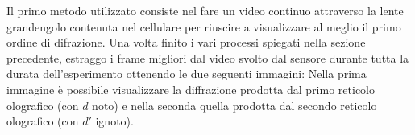 Il primo metodo utilizzato consiste nel fare un video continuo attraverso la lente grandengolo contenuta nel cellulare per riuscire a visualizzare al meglio il primo ordine di difrazione. Una volta finito i vari processi spiegati nella sezione precedente, estraggo i frame migliori dal video svolto dal sensore durante tutta la durata dell'esperimento ottenendo le due seguenti immagini:
Nella prima immagine è possibile visualizzare la diffrazione prodotta dal primo reticolo olografico (con $d$ noto) e nella seconda quella prodotta dal secondo reticolo olografico (con $d'$ ignoto).